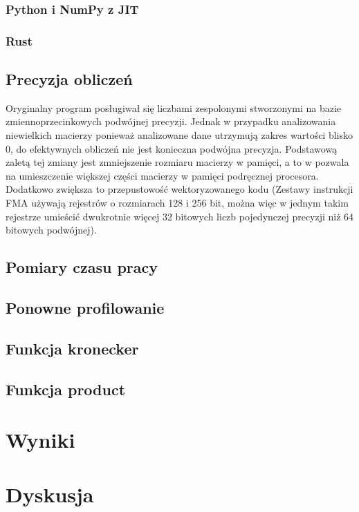 \documentclass[10pt, a4paper]{article}
\begin{document}
\begin{sloppypar}
    \subsubsection{ Python i NumPy z JIT }


    \subsubsection{ Rust }


    \subsection{Precyzja obliczeń}


    Oryginalny program posługiwał się liczbami zespolonymi stworzonymi na bazie
    zmiennoprzecinkowych podwójnej precyzji. Jednak w przypadku analizowania niewielkich
    macierzy ponieważ analizowane dane utrzymują zakres wartości blisko 0, do
    efektywnych obliczeń nie jest konieczna podwójna precyzja. Podstawową zaletą tej zmiany
    jest zmniejszenie rozmiaru macierzy w pamięci, a to w pozwala na umieszczenie
    większej części macierzy w pamięci podręcznej procesora. Dodatkowo zwiększa to przepustowość
    wektoryzowanego kodu (Zestawy instrukcji FMA używają rejestrów o rozmiarach 128 i
    256 bit, można więc w jednym takim rejestrze umieścić dwukrotnie więcej 32 bitowych liczb
    pojedynczej precyzji niż 64 bitowych podwójnej).

    \subsection{Pomiary czasu pracy}


    \subsection{Ponowne profilowanie}


    \subsection{Funkcja kronecker}


    \subsection{Funkcja product}


    \section{Wyniki}


    \section{Dyskusja}
  \end{sloppypar}
  \newpage
  \begin{sloppypar}
    \medskip


    \printbibliography
    [heading=bibintoc, title={Odwołania}]
  \end{sloppypar}
\end{document}
